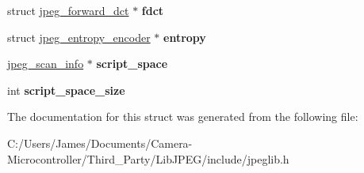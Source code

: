 \begin{DoxyCompactItemize}
\item 
\mbox{\label{structjpeg__compress__struct_a5bd928e202430d66e824647256ca41e8}} 
struct \hyperlink{structjpeg__forward__dct}{jpeg\+\_\+forward\+\_\+dct} $\ast$ {\bfseries fdct}
\item 
\mbox{\label{structjpeg__compress__struct_a0a4b3a1dc7e5d960babc700bccda8f64}} 
struct \hyperlink{structjpeg__entropy__encoder}{jpeg\+\_\+entropy\+\_\+encoder} $\ast$ {\bfseries entropy}
\item 
\mbox{\label{structjpeg__compress__struct_a4f0976031f78e61ee88de972b97e778b}} 
\hyperlink{structjpeg__scan__info}{jpeg\+\_\+scan\+\_\+info} $\ast$ {\bfseries script\+\_\+space}
\item 
\mbox{\label{structjpeg__compress__struct_ab27e6e300ea6d9989647506f2718c76c}} 
int {\bfseries script\+\_\+space\+\_\+size}
\end{DoxyCompactItemize}


The documentation for this struct was generated from the following file\+:\begin{DoxyCompactItemize}
\item 
C\+:/\+Users/\+James/\+Documents/\+Camera-\/\+Microcontroller/\+Third\+\_\+\+Party/\+Lib\+J\+P\+E\+G/include/jpeglib.\+h\end{DoxyCompactItemize}
